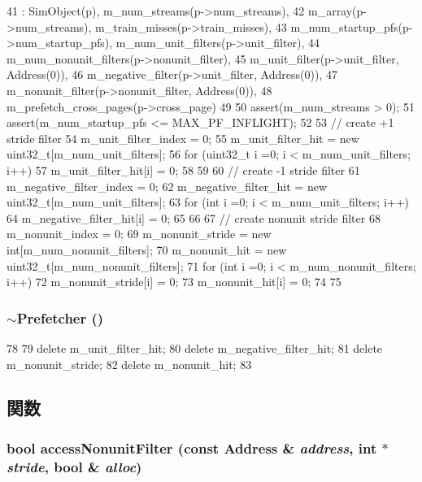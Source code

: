 \begin{DoxyCode}
41     : SimObject(p), m_num_streams(p->num_streams),
42     m_array(p->num_streams), m_train_misses(p->train_misses),
43     m_num_startup_pfs(p->num_startup_pfs), m_num_unit_filters(p->unit_filter),
44     m_num_nonunit_filters(p->nonunit_filter),
45     m_unit_filter(p->unit_filter, Address(0)),
46     m_negative_filter(p->unit_filter, Address(0)),
47     m_nonunit_filter(p->nonunit_filter, Address(0)),
48     m_prefetch_cross_pages(p->cross_page)
49 {
50     assert(m_num_streams > 0);
51     assert(m_num_startup_pfs <= MAX_PF_INFLIGHT);
52 
53     // create +1 stride filter
54     m_unit_filter_index = 0;
55     m_unit_filter_hit = new uint32_t[m_num_unit_filters];
56     for (uint32_t i =0; i < m_num_unit_filters; i++) {
57         m_unit_filter_hit[i] = 0;
58     }
59 
60     // create -1 stride filter
61     m_negative_filter_index = 0;
62     m_negative_filter_hit = new uint32_t[m_num_unit_filters];
63     for (int i =0; i < m_num_unit_filters; i++) {
64         m_negative_filter_hit[i] = 0;
65     }
66 
67     // create nonunit stride filter
68     m_nonunit_index = 0;
69     m_nonunit_stride = new int[m_num_nonunit_filters];
70     m_nonunit_hit    = new uint32_t[m_num_nonunit_filters];
71     for (int i =0; i < m_num_nonunit_filters; i++) {
72         m_nonunit_stride[i] = 0;
73         m_nonunit_hit[i]    = 0;
74     }
75 }
\end{DoxyCode}
\hypertarget{classPrefetcher_a7b071405fe38f9da007866b7510e773c}{
\subsubsection[{$\sim$Prefetcher}]{\setlength{\rightskip}{0pt plus 5cm}$\sim${\bf Prefetcher} ()}}
\label{classPrefetcher_a7b071405fe38f9da007866b7510e773c}



\begin{DoxyCode}
78 {
79     delete m_unit_filter_hit;
80     delete m_negative_filter_hit;
81     delete m_nonunit_stride;
82     delete m_nonunit_hit;
83 }
\end{DoxyCode}


\subsection{関数}
\hypertarget{classPrefetcher_a11579c7a5838c568fb11ac662a82d6f5}{
\subsubsection[{accessNonunitFilter}]{\setlength{\rightskip}{0pt plus 5cm}bool accessNonunitFilter (const {\bf Address} \& {\em address}, \/  int $\ast$ {\em stride}, \/  bool \& {\em alloc})}}
\label{classPrefetcher_a11579c7a5838c568fb11ac662a82d6f5}


